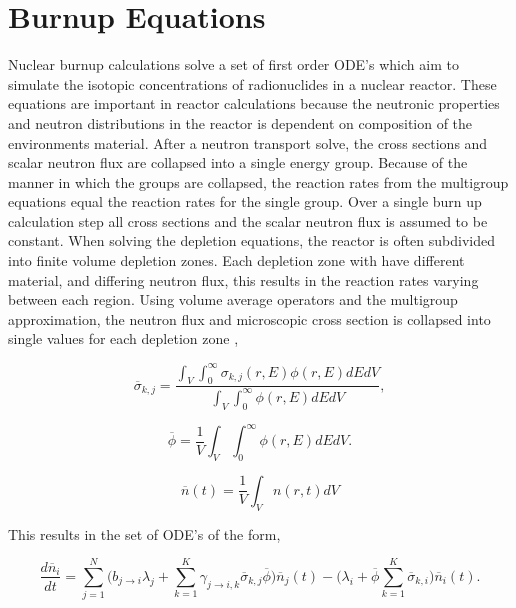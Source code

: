 \section{Burnup Equations}
Nuclear burnup calculations solve a set of first order ODE's which aim to simulate the isotopic concentrations of radionuclides in a nuclear reactor. These equations are important in reactor calculations because the neutronic properties and neutron distributions in the reactor is dependent on composition of the environments material. After a neutron transport solve, the cross sections and scalar neutron flux are collapsed into a single energy group. Because of the manner in which the groups are collapsed, the reaction rates from the multigroup equations equal the reaction rates for the single group. Over a single burn up calculation step all cross sections and the scalar neutron flux is assumed to be constant. When solving the depletion equations, the reactor is often subdivided into finite volume depletion zones. Each depletion zone with have different material, and differing neutron flux, this results in the reaction rates varying between each region. Using volume average operators and the multigroup approximation, the neutron flux and microscopic cross section is collapsed into single values for each depletion zone \cite{aarnoThesis},

\begin{equation}
    \overline{\sigma}_{k,j} = \frac{\int_{V}\int_{0}^{\infty}\sigma_{k,j}(r,E)\phi(r,E) dEdV}{\int_{V}\int_{0}^{\infty}\phi(r,E) dEdV},
\end{equation}

\begin{equation}
    \overline{\phi} = \frac{1}{V}\int_{V}\int_{0}^{\infty}\phi(r,E)dEdV.
\end{equation}

\begin{equation}
    \overline{n}(t) = \frac{1}{V}\int_{V}n(r,t)dV
\end{equation}

\noindent This results in the set of ODE's of the form,

\begin{equation}
    \frac{d\overline{n}_{i}}{dt} = \sum_{j=1}^{N}\bigg(b_{j\rightarrow i}\lambda_{j} + 
    \sum_{k=1}^{K}\gamma_{j\rightarrow i,k}\overline{\sigma}_{k,j}\overline{\phi} \bigg)\overline{n}_{j}(t) - \bigg(\lambda_{i} + \overline{\phi}\sum_{k=1}^{K} \overline{\sigma}_{k,i}\bigg)\overline{n}_{i}(t).
    \label{eq:LWRDepletion}
\end{equation}

